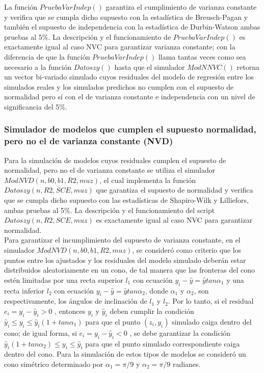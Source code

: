 La función $PruebaVarIndep()$ garantiza el cumplimiento de varianza constante y verifica que se cumpla dicho supuesto con la estadística de Breusch-Pagan y también el supuesto de independencia con la estadística de Durbin-Watson ambas pruebas al 5\%. La descripción y el funcionamiento de $PruebaVarIndep()$ es exactamente igual al caso NVC para garantizar varianza constante; con la diferencia de que la función $PruebaVarIndep()$ llama tantas veces como sea necesario a la función $Datoszy()$ hasta que el simulador $ModNNVC()$  retorna un vector bi-variado simulado cuyos residuales del modelo de regresión entre los simulados reales y los simulados predichos no cumplen con el supuesto de normalidad pero sí con el de varianza constante e independencia con un nivel de significancia del 5\%.\\ 

\subsubsection{Simulador de modelos que cumplen el supuesto normalidad, pero no el de varianza constante (NVD)}

Para la simulación de modelos cuyos residuales cumplen el supuesto de normalidad, pero no el de varianza constante se utiliza el simulador $ModNVD(n,b0,b1,R2,muz)$, el cual implementa la función $Datoszy(n,R2,SCE,muz)$ que garantiza el supuesto de normalidad y verifica que se cumpla dicho supuesto con las estadísticas de Shapiro-Wilk y Lilliefors, ambas pruebas al 5\%. La descripción y el funcionamiento del script $Datoszy(n,R2,SCE,muz)$ es exactamente igual al caso NVC para garantizar normalidad.\\


Para garantizar el incumplimiento del supuesto de varianza constante, en el simulador \newline $ModNVD(n,b0,b1,R2,muz)$, se consideró como criterio que los puntos entre los ajustados y los residuales del modelo simulado deberán estar distribuidos aleatoriamente en un cono, de tal manera que las fronteras del cono estén limitadas por una recta superior $l_1$ con ecuación $y_i-\hat{y}=\hat{y}tan \alpha_1$ y una recta inferior $l_2$ con ecuación $y_i-\hat{y}=\hat{y}tan \alpha_2$, donde  $\alpha_1$ y $\alpha_2$, son respectivamente, los ángulos de inclinación de $l_1$ y $l_2$. Por lo tanto, si el residual $e_i=y_i - \hat{y}_i > 0$ , entonces $y_i$ y $\hat{y}_i$ deben cumplir la condición $\hat{y}_i \leq y_i \leq \hat{y}_i (1+tan \alpha_1)$ para que el punto $(z_i,y_i)$ simulado caiga dentro del cono; de igual forma, si $e_i=y_i - \hat{y}_i < 0$ , se debe garantizar la condición $\hat{y}_i (1+tan \alpha_2) \leq y_i \leq \hat{y}_i $ para que el punto simulado correspondiente caiga dentro del cono. Para la simulación de estos tipos de modelos se consideró un cono simétrico determinado por $\alpha_1=\pi / 9$ y $\alpha_2=\pi/9$ radianes. \\


